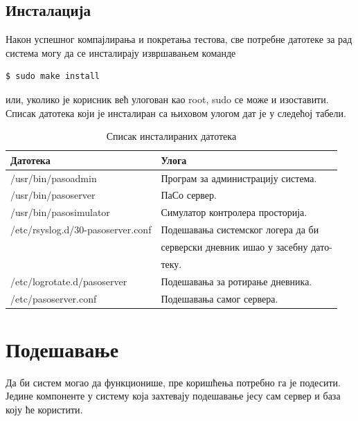 \documentclass[a4paper, 12pt, diplomski]{etfcyr}
\begin{document}
			\subsection{Инсталација}
				\begin{justify}
					Након успешног компајлирања и покретања тестова, све потребне датотеке за рад система могу да се инсталирају извршавањем команде
					\begin{footnotesize}
						\begin{verbatim}
$ sudo make install
						\end{verbatim}
					\end{footnotesize}
					или, уколико је корисник већ улогован као root, sudo се може и изоставити. Списак датотека који је инсталиран са њиховом улогом дат је у следећој табели.
					\begin{table}[H]
						\begin{tabular}{l l}
							Датотека & Улога \\
							\hline
							/usr/bin/pasoadmin & Програм за администрацију система. \\
							/usr/bin/pasoserver & ПаСо сервер. \\
							/usr/bin/pasosimulator & Симулатор контролера просторија. \\
							/etc/rsyslog.d/30-pasoserver.conf & Подешавања системског логера да би \\
							&серверски дневник ишао у засебну дато- \\
							&теку. \\
							/etc/logrotate.d/pasoserver & Подешавања за ротирање дневника. \\
							/etc/pasoserver.conf & Подешавања самог сервера. \\
							\hline
						\end{tabular}
						\caption{Списак инсталираних датотека}
						\label{table:installed_files}
					\end{table}
				\end{justify}

		\newpage
		
		\section{Подешавање}
			\begin{justify}
				Да би систем могао да функционише, пре коришћења потребно га је подесити. Једине компоненте у систему која захтевају подешавање јесу сам сервер и база коју ће користити.
			\end{justify}
\end{document}
